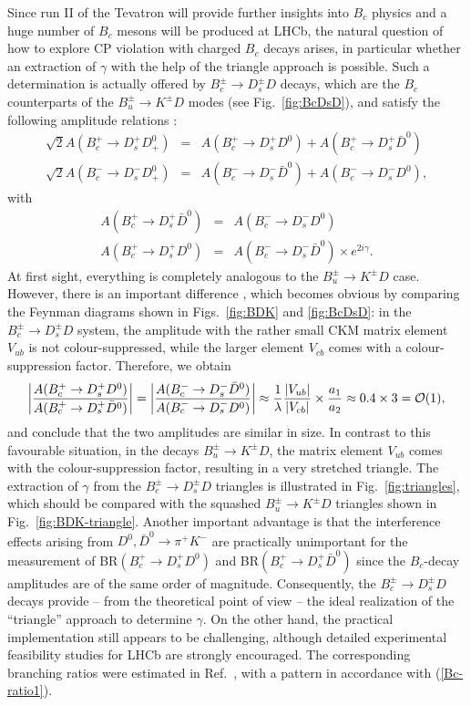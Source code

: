 \documentclass[12pt]{article}
\begin{document}
Since run II of the Tevatron will provide further insights into $B_c$ physics and 
a huge number of $B_c$ mesons will be produced at LHCb, the 
natural question of how to explore CP violation with charged $B_c$ decays arises,
in particular whether an extraction of $\gamma$ with the help of the
triangle approach is possible.  Such a determination is actually offered by 
$B_c^\pm\to D_s^\pm D$ decays, which are the $B_c$ counterparts 
of the $B_u^\pm\to K^\pm D$ modes (see Fig.\ \ref{fig:BcDsD}), 
and satisfy the following amplitude relations \cite{masetti}:
\begin{eqnarray}
\sqrt{2}A(B_c^+\to D_s^+D^0_+)&=&A(B_c^+\to D_s^+D^0)+
A(B_c^+\to D_s^+\bar D^0)\\
\sqrt{2}A(B_c^-\to D_s^-D^0_+)&=&A(B_c^-\to D_s^-\bar D^0)+
A(B_c^-\to D_s^-D^0),
\end{eqnarray}
with
\begin{eqnarray}
A(B^+_c\to D_s^+\bar D^0)&=&A(B^-_c\to D_s^-D^0)\\
A(B_c^+\to D_s^+D^0)&=&A(B_c^-\to D_s^-\bar D^0)\times e^{2i\gamma}.
\end{eqnarray}
At first sight, everything is completely analogous to the $B_u^\pm\to K^\pm D$
case. However, there is an important difference \cite{fw}, 
which becomes obvious by comparing the Feynman diagrams shown in 
Figs.~\ref{fig:BDK} and \ref{fig:BcDsD}: in the $B_c^\pm\to D_s^\pm D$ 
system, the amplitude with the rather small CKM matrix element $V_{ub}$ 
is not colour-suppressed, while the larger element $V_{cb}$ comes with 
a colour-suppression factor. Therefore, we obtain
\begin{equation}\label{Bc-ratio1}
\left|\frac{A(B^+_c\to D_s^+ D^0)}{A(B^+_c\to D_s^+ 
\bar D^0)}\right|=\left|\frac{A(B^-_c\to D_s^-\bar D^0)}{A(B^-_c\to D_s^- 
D^0)}\right|\approx\frac{1}{\lambda}\frac{|V_{ub}|}{|V_{cb}|}
\times\frac{a_1}{a_2}\approx0.4\times 3 = {\cal O}(1),
\end{equation}
and conclude that the two amplitudes are similar in size. In contrast 
to this favourable situation, in the decays $B_u^{\pm}\to K^{\pm}D$, 
the matrix element $V_{ub}$ comes with the colour-suppression factor, 
resulting in a very stretched triangle. The extraction of $\gamma$ from 
the $B_c^\pm\to D_s^\pm D$ triangles is illustrated in 
Fig.~\ref{fig:triangles}, which should be compared with the
squashed $B^\pm_u\to K^\pm D$ triangles shown in 
Fig.\ \ref{fig:BDK-triangle}. Another important advantage is that 
the interference effects arising from $D^0,\bar D^0\to\pi^+K^-$ are 
practically unimportant for the measurement of BR$(B^+_c\to D_s^+ D^0)$ 
and BR$(B^+_c\to D_s^+ \bar D^0)$ since the $B_c$-decay amplitudes are 
of the same order of magnitude. Consequently, the $B_c^\pm\to D_s^\pm D$
decays provide -- from the theoretical point of view -- the ideal
realization of the ``triangle'' approach to determine $\gamma$. On
the other hand, the practical implementation still appears to 
be challenging, although detailed experimental feasibility studies for
LHCb are strongly encouraged. The corresponding branching ratios
were estimated in Ref.~\cite{IKP}, with a pattern in accordance 
with (\ref{Bc-ratio1}). 
\end{document}
